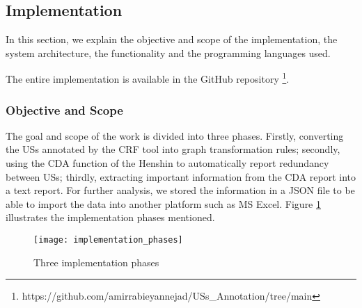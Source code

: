 \subsection{Implementation}\label{redundancy_implementation}
In this section, we explain the objective and scope of the implementation, the system architecture, the functionality and the programming languages used.

The entire implementation is available in the GitHub repository \footnote{https://github.com/amirrabieyannejad/USs\_Annotation/tree/main}.
\subsubsection*{Objective and Scope}
The goal and scope of the work is divided into three phases. Firstly, converting the USs annotated by the CRF tool into graph transformation rules; secondly, using the CDA function of the Henshin to automatically report redundancy between USs; thirdly, extracting important information from the CDA report into a text report. For further analysis, we stored the information in a JSON file to be able to import the data into another platform such as MS Excel.
Figure \ref{fig:implementation_phases} illustrates the implementation phases mentioned.
\begin{figure}[h]
	\center
	\texttt{[image: implementation\_phases]}
	\caption{Three implementation phases }\label{fig:implementation_phases}
\end{figure} 
